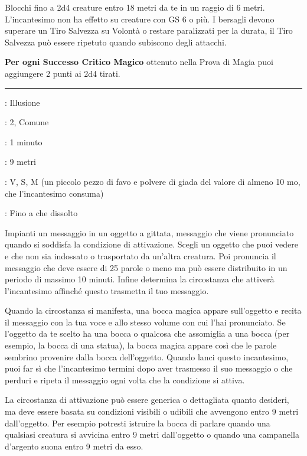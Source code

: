\begin{multicols}{2}
Blocchi fino a 2d4 creature entro 18 metri da te in un raggio di 6 metri. L'incantesimo non ha effetto su creature con GS 6 o più. I bersagli devono superare un Tiro Salvezza su Volontà o restare paralizzati per la durata, il Tiro Salvezza può essere ripetuto quando subiscono degli attacchi.

\textbf{Per ogni Successo Critico Magico} ottenuto nella Prova di Magia puoi aggiungere 2 punti ai 2d4 tirati.

\smallskip\noindent\rule{\linewidth}{2pt} \hypertarget{Bocca Magica}{}\medskip{}
\noindent
\begin{description}[noitemsep, topsep=0pt, parsep=0pt, partopsep=0pt, leftmargin=0cm, labelwidth=2.8cm]
	\item[\textbf{Lista di Magia}]: Illusione
	\item[\textbf{Livello}]: 2, Comune
	\item[\textbf{T. di Lancio}]: 1 minuto
	\item[\textbf{Gittata}]: 9 metri
	\item[\textbf{Componenti}]: V, S, M (un piccolo pezzo di favo e polvere di giada del valore di almeno 10 mo, che l'incantesimo consuma)
	\item[\textbf{Durata}]: Fino a che dissolto
\end{description}

Impianti un messaggio in un oggetto a gittata, messaggio che viene pronunciato quando si soddisfa la condizione di attivazione. Scegli un oggetto che puoi vedere e che non sia indossato o trasportato da un'altra creatura. Poi pronuncia il messaggio che deve essere di 25 parole o meno ma può essere distribuito in un periodo di massimo 10 minuti. Infine determina la circostanza che attiverà l'incantesimo affinché questo trasmetta il tuo messaggio.

Quando la circostanza si manifesta, una bocca magica appare sull'oggetto e recita il messaggio con la tua voce e allo stesso volume con cui l'hai pronunciato. Se l'oggetto da te scelto ha una bocca o qualcosa che assomiglia a una bocca (per esempio, la bocca di una statua), la bocca magica appare così che le parole sembrino provenire dalla bocca dell'oggetto. Quando lanci questo incantesimo, puoi far sì che l'incantesimo termini dopo aver trasmesso il suo messaggio o che perduri e ripeta il messaggio ogni volta che la condizione si attiva.

La circostanza di attivazione può essere generica o dettagliata quanto desideri, ma deve essere basata su condizioni visibili o udibili che avvengono entro 9 metri dall'oggetto. Per esempio potresti istruire la bocca di parlare quando una qualsiasi creatura si avvicina entro 9 metri dall'oggetto o quando una campanella d'argento suona entro 9 metri da esso.


\end{multicols}
